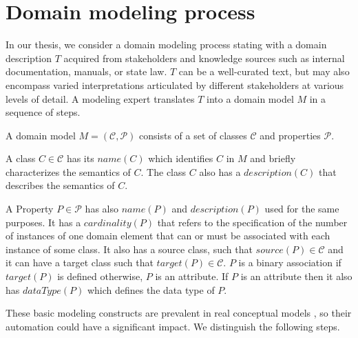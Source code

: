 \chapter{Domain modeling process}

In our thesis, we consider a domain modeling process stating with a domain description $T$ acquired from stakeholders and knowledge sources such as internal documentation, manuals, or state law. $T$ can be a well-curated text, but may also encompass varied interpretations articulated by different stakeholders at various levels of detail. A modeling expert translates $T$ into a domain model $M$ in a sequence of steps.

A domain model $M = (\mathcal{C}, \mathcal{P})$ consists of a set of classes $\mathcal{C}$ and properties $\mathcal{P}$.

A class $C \in \mathcal{C}$ has its $name(C)$ which identifies $C$ in $M$ and briefly characterizes the semantics of $C$. The class $C$ also has a $description(C)$ that describes the semantics of $C$.

A Property $P \in \mathcal{P}$ has also $name(P)$ and $description(P)$ used for the same purposes. It has a $cardinality(P)$ that refers to the specification of the number of instances of one domain element that can or must be associated with each instance of some class. It also has a source class, such that $source(P) \in \mathcal{C}$ and it can have a target class such that $target(P) \in \mathcal{C}$. $P$ is a binary association if $target(P)$ is defined otherwise, $P$ is an attribute. If $P$ is an attribute then it also has $dataType(P)$ which defines the data type of $P$.

These basic modeling constructs are prevalent in real conceptual models \cite{Keet2015}, so their automation could have a significant impact. We distinguish the following steps.


